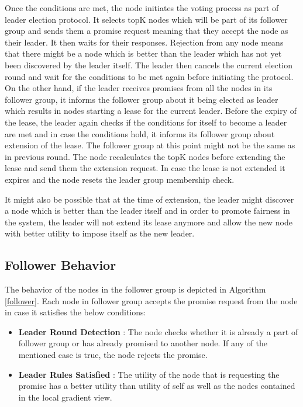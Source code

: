 \documentclass[a4paper,11pt]{kth-mag}
\begin{document}
Once the conditions are met, the node initiates the voting process as part of leader election protocol. It selects topK nodes which will be part of  its follower group and sends them a promise request meaning that they accept the node as their leader. It then waits for their responses. Rejection from any node means that there might be a node which is better than the leader which has not yet been discovered by the leader itself. The leader then cancels the current election round and wait for the conditions to be met again before initiating the protocol.
On the other hand, if the leader receives promises from all the nodes in its follower group, it informs the follower group about it being elected as leader which results in nodes starting a lease for the current leader.  Before the expiry of the lease, the leader again checks if the conditions for itself to become a leader are met and in case the conditions hold, it informs its follower group about extension of the lease. The follower group at this point might not be the same as in previous round. The node recalculates the topK nodes before extending the lease and send them the extension request. In case the lease is not extended it expires and the node resets the leader group membership check.

It might also be possible that at the time of extension, the leader might discover a node which is better than the leader itself and in order to promote fairness in the system, the leader will not extend its lease anymore and allow the new node with better utility to impose itself as the new leader.


\subsection{Follower Behavior}

The behavior of the nodes in the follower group is depicted in Algorithm \ref{follower}. Each node in follower group accepts the promise request from the node in case it satisfies the below conditions:

\begin{itemize}

\item \textbf{Leader Round Detection} : The node checks whether it is already a part of follower group or has already promised to another node. If any of the mentioned case is true, the node rejects the promise.

\item \textbf{Leader Rules Satisfied} : The utility of the node that is requesting the promise has a better utility than utility of self as well as the nodes contained in the local gradient view.

\end{itemize}
\end{document}
